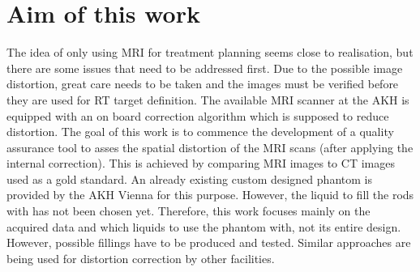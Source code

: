 \section{Aim of this work}
The idea of only using MRI for treatment planning seems close to realisation, but there are some issues that need to be addressed first.
Due to the possible image distortion, great care needs to be taken and the images must be verified before they are used for RT target definition.
The available MRI scanner at the AKH is equipped with an on board correction algorithm which is supposed to reduce distortion.
The goal of this work is to commence the development of a quality assurance tool to asses the spatial distortion of the MRI scans (after applying the internal correction).
This is achieved by comparing MRI images to CT images used as a gold standard.
An already existing custom designed phantom is provided by the AKH Vienna for this purpose.
However, the liquid to fill the rods with has not been chosen yet.
Therefore, this work focuses mainly on the acquired data and which liquids to use the phantom with, not its entire design.
However, possible fillings have to be produced and tested.
Similar approaches are being used for distortion correction by other facilities. \cite{Price2015, Petersch2004, Torfeh2015, Wang2004, Wang2004b, Mizowaki2000}



\newpage